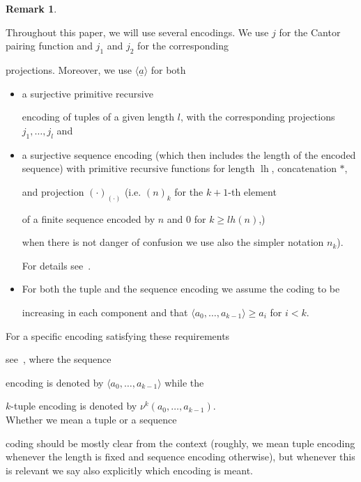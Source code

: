 \documentclass[1p]{elsarticle}
\DeclareMathOperator{\lh}{lh}  %
\newcommand{\tup}{\underline} %
\theoremstyle{plain}
\theoremstyle{definition}
\newtheorem{rmk}[thm]{Remark}
\theoremstyle{remark}
\theoremstyle{definition}
\begin{document}
\begin{rmk} \label{remark-coding}

Throughout this paper, we will use several encodings. We use $j$ for the Cantor pairing function and $j_1$ and $j_2$ for the corresponding

projections. Moreover, we use $\langle \tup a \rangle$ for both

\begin{itemize}

\item a surjective primitive recursive 

encoding of tuples of a given length $l$, with the corresponding projections $j_1,\ldots,j_l$ and

\item 

a surjective sequence encoding (which then includes the length of the encoded sequence) with primitive recursive functions for length $\lh$, concatenation $*$, 

and projection $(\cdot)_{(\cdot)}$ (i.e. $(n)_k$ for the $k+1$-th element 

of a finite sequence encoded by $n$ and $0$ for $k\ge lh(n)$,) 

when there is not danger of confusion we use also the simpler notation $n_k$). 

For details see~\cite{Kohlenbach(book)}.

\item 

For both the tuple and the sequence encoding we assume the coding to be 

increasing in each component and that $\langle a_0,\ldots,a_{k-1}\rangle 

\ge a_i$ for $i<k.$

\end{itemize}

For a specific encoding satisfying these requirements 

see~\cite{Kohlenbach(book)}, where the sequence

encoding is denoted by $\langle a_0,\ldots,a_{k-1}\rangle$ while the

$k$-tuple encoding is denoted by $\nu^k(a_0,\ldots,a_{k-1})$. \\[1mm] Whether we mean a tuple or a sequence 

coding should be mostly clear from the context (roughly, we mean tuple encoding whenever the length is fixed and sequence encoding otherwise), but whenever this is relevant we say also explicitly which encoding is meant.

\end{rmk}
\end{document}
